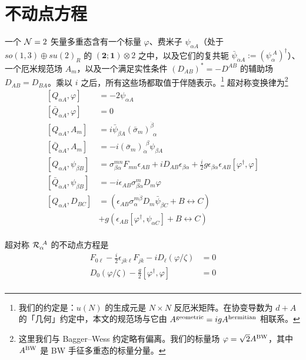 \section{不动点方程}
\label{app:Fixed-Point-Equations}

一个 $\mathcal{N}=2$ 矢量多重态含有一个标量 $\varphi$、费米子 $\psi_{\alpha A}$（处于 $so(1,3)\oplus su(2)_R$ 的 $(\mathbf{2};\mathbf{1})\otimes 2$ 之中，以及它们的复共轭 $\bar \psi_{\dot \alpha A} := (\psi_{\alpha}^{~A})^\dagger$）、一个厄米规范场 $A_m$，以及一个满足实性条件 $(D_{AB})^* = - D^{AB}$ 的辅助场 $D_{AB} = D_{BA}$。乘以 $i$ 之后，所有这些场都取值于伴随表示。\footnote{我们的约定是：$u(N)$ 的生成元是 $N\times N$ 反厄米矩阵。在协变导数为 $d +A$ 的「几何」约定中，本文的规范场与它由 $A^{\rm geometric} = i g A^{\rm hermitian}$ 相联系。} 超对称变换律为\footnote{这里我们与 Bagger--Wess 约定略有偏离。我们的标量场 $\varphi=\sqrt{2}A^{\rm BW}$，其中 $A^{\rm BW}$ 是 BW 手征多重态的标量分量。}
%
\begin{equation}
\begin{split}
[Q_{\alpha A}, \varphi] & = - 2 \psi_{\alpha A} \\
[\bar Q_{\dot\alpha A}, \varphi] & = 0 \\
[Q_{\alpha A}, A_m] & = i \bar \psi_{\dot \beta A} (\bar
\sigma_m)^{\dot \beta}_{~~\alpha} \\
[\bar Q_{\dot \alpha A}, A_m] & = -i (\bar
\sigma_m)_{\dot \alpha}^{~~\beta}  \psi_{ \beta A}  \\
 [Q_{\alpha A}, \psi_{\beta B} ] & =
\sigma^{mn}_{\beta\alpha} F_{mn} \epsilon_{AB} + i D_{AB}
\epsilon_{\beta\alpha} + \frac{i}{2} g
\epsilon_{\beta\alpha} \epsilon_{AB} [\varphi^\dagger, \varphi] \\
[\bar Q_{\dot \alpha A}, \psi_{\beta B} ] & = - i   \epsilon_{AB} \sigma^m_{\beta\dot\alpha} D_m\varphi \\
[Q_{\alpha A}, D_{BC}  ] & = \left( \epsilon_{AB}
\sigma_{\alpha}^{m\dot \beta} D_m \bar\psi_{\dot \beta C} +
B\leftrightarrow C \right) \\
& +   g \left(\epsilon_{AB} [ \varphi^\dagger, \psi_{\alpha C}] +
B\leftrightarrow C   \right)\\
\end{split}
\end{equation}

超对称 $\mathcal{R}_{\alpha}^{~A}$ 的不动点方程是
%
\begin{equation}\label{eq:Q-zeta-fix}
\begin{split}
F_{0\ell} - \frac{i}{2} \epsilon_{jk\ell} F_{jk} - i   D_\ell
( \varphi/\zeta) & = 0\\
D_0(  \varphi/\zeta) - \frac{g}{2} [  \varphi^\dagger,
  \varphi ] & = 0 \\
\end{split}
\end{equation}

